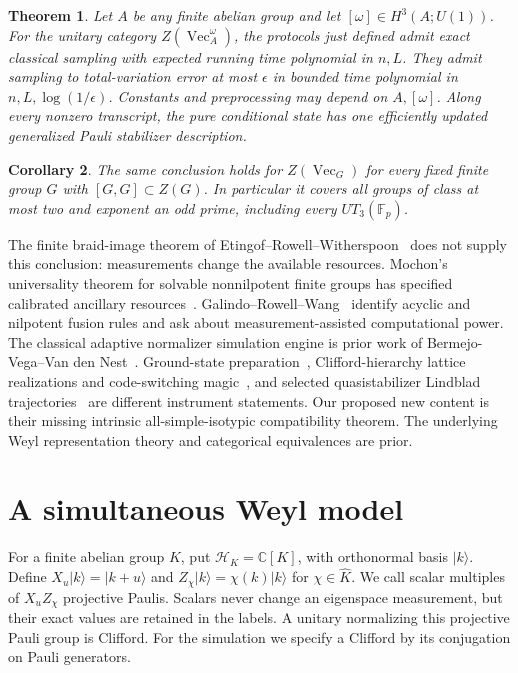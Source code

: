 \documentclass[11pt]{amsart}
\newtheorem{theorem}{Theorem}
\newtheorem{corollary}[theorem]{Corollary}
\theoremstyle{definition}\newtheorem{definition}[theorem]{Definition}
\newcommand{\C}{\mathbb C}
\newcommand{\VEC}{\operatorname{Vec}}
\begin{document}
\begin{theorem}\label{thm:main}
Let $A$ be any finite abelian group and let $[\omega]\in H^3(A;U(1))$.
For the unitary category $Z(\VEC_A^\omega)$, the protocols just defined admit
exact classical sampling with expected running time polynomial in $n,L$.
They admit sampling to total-variation error at most $\epsilon$ in bounded
time polynomial in $n,L,\log(1/\epsilon)$. Constants and preprocessing may
depend on $A,[\omega]$. Along every nonzero transcript, the pure conditional
state has one efficiently updated generalized Pauli stabilizer description.
\end{theorem}

\begin{corollary}\label{cor:nil2}
The same conclusion holds for $Z(\VEC_G)$ for every fixed finite group $G$
with $[G,G]\subset Z(G)$. In particular it covers all groups of class at most
two and exponent an odd prime, including every $UT_3(\mathbb F_p)$.
\end{corollary}

The finite braid-image theorem of Etingof--Rowell--Witherspoon~\cite{ERW}
does not supply this conclusion: measurements change the available resources.
Mochon's universality theorem for solvable nonnilpotent finite groups has specified
calibrated ancillary resources~\cite{Mochon}. Galindo--Rowell--Wang~\cite{GRW}
identify acyclic and nilpotent fusion rules and ask about measurement-assisted
computational power. The classical adaptive normalizer simulation engine is
prior work of Bermejo-Vega--Van den Nest~\cite{BV}.
Ground-state preparation~\cite{TVV}, Clifford-hierarchy lattice realizations
and code-switching magic~\cite{Fechisin}, and selected quasistabilizer Lindblad
trajectories~\cite{Chirame} are different instrument statements. Our proposed
new content is their missing intrinsic all-simple-isotypic compatibility theorem.
The underlying Weyl representation theory and categorical equivalences are prior.

\section{A simultaneous Weyl model}
For a finite abelian group $K$, put $\mathcal H_K=\C[K]$, with orthonormal
basis $|k\rangle$. Define $X_u|k\rangle=|k+u\rangle$ and
$Z_\chi|k\rangle=\chi(k)|k\rangle$ for $\chi\in\widehat K$.
We call scalar multiples of $X_uZ_\chi$ projective Paulis. Scalars never change
an eigenspace measurement, but their exact values are retained in the labels.
A unitary normalizing this projective Pauli group is Clifford. For the
simulation we specify a Clifford by its conjugation on Pauli generators.
\end{document}
